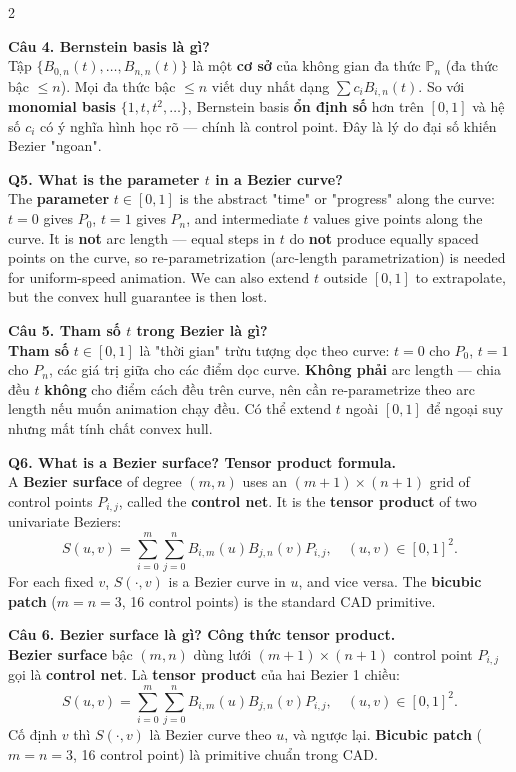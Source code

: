 \begin{paracol}{2}
\switchcolumn

\textbf{Câu 4. Bernstein basis là gì?}\\
Tập $\{B_{0,n}(t), \ldots, B_{n,n}(t)\}$ là một \textbf{cơ sở} của không gian đa thức $\mathbb{P}_n$ (đa thức bậc $\le n$). Mọi đa thức bậc $\le n$ viết duy nhất dạng $\sum c_i B_{i,n}(t)$. So với \textbf{monomial basis} $\{1, t, t^2, \ldots\}$, Bernstein basis \textbf{ổn định số} hơn trên $[0,1]$ và hệ số $c_i$ có ý nghĩa hình học rõ — chính là control point. Đây là lý do đại số khiến Bezier "ngoan".

\switchcolumn*

\textbf{Q5. What is the parameter $t$ in a Bezier curve?}\\
The \textbf{parameter} $t \in [0,1]$ is the abstract "time" or "progress" along the curve: $t=0$ gives $P_0$, $t=1$ gives $P_n$, and intermediate $t$ values give points along the curve. It is \textbf{not} arc length — equal steps in $t$ do \textbf{not} produce equally spaced points on the curve, so re-parametrization (arc-length parametrization) is needed for uniform-speed animation. We can also extend $t$ outside $[0,1]$ to extrapolate, but the convex hull guarantee is then lost.

\switchcolumn

\textbf{Câu 5. Tham số $t$ trong Bezier là gì?}\\
\textbf{Tham số} $t \in [0,1]$ là "thời gian" trừu tượng dọc theo curve: $t=0$ cho $P_0$, $t=1$ cho $P_n$, các giá trị giữa cho các điểm dọc curve. \textbf{Không phải} arc length — chia đều $t$ \textbf{không} cho điểm cách đều trên curve, nên cần re-parametrize theo arc length nếu muốn animation chạy đều. Có thể extend $t$ ngoài $[0,1]$ để ngoại suy nhưng mất tính chất convex hull.

\switchcolumn*

\textbf{Q6. What is a Bezier surface? Tensor product formula.}\\
A \textbf{Bezier surface} of degree $(m, n)$ uses an $(m{+}1)\times(n{+}1)$ grid of control points $P_{i,j}$, called the \textbf{control net}. It is the \textbf{tensor product} of two univariate Beziers:
\[ S(u, v) = \sum_{i=0}^{m} \sum_{j=0}^{n} B_{i,m}(u) B_{j,n}(v) P_{i,j}, \quad (u,v)\in[0,1]^2. \]
For each fixed $v$, $S(\cdot, v)$ is a Bezier curve in $u$, and vice versa. The \textbf{bicubic patch} ($m=n=3$, 16 control points) is the standard CAD primitive.

\switchcolumn

\textbf{Câu 6. Bezier surface là gì? Công thức tensor product.}\\
\textbf{Bezier surface} bậc $(m, n)$ dùng lưới $(m{+}1)\times(n{+}1)$ control point $P_{i,j}$ gọi là \textbf{control net}. Là \textbf{tensor product} của hai Bezier 1 chiều:
\[ S(u, v) = \sum_{i=0}^{m} \sum_{j=0}^{n} B_{i,m}(u) B_{j,n}(v) P_{i,j}, \quad (u,v)\in[0,1]^2. \]
Cố định $v$ thì $S(\cdot, v)$ là Bezier curve theo $u$, và ngược lại. \textbf{Bicubic patch} ($m=n=3$, 16 control point) là primitive chuẩn trong CAD.


\end{paracol}
